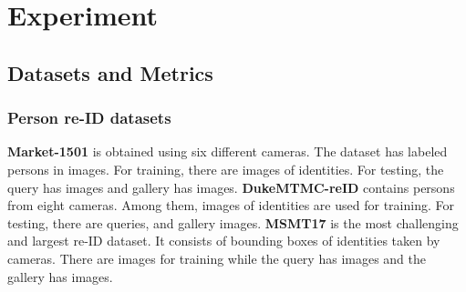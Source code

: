 \documentclass[journal]{IEEEtran}
\begin{document}
\section{Experiment}
\subsection{Datasets and Metrics}
\subsubsection{Person re-ID datasets}
\textbf{Market-1501} \cite{zheng2015scalable} is obtained using six different cameras. The dataset has  labeled persons in  images. For training, there are  images of  identities. For testing, the query has  images and gallery has  images. \textbf{DukeMTMC-reID} \cite{zheng2017unlabeled} contains  persons from eight cameras. Among them,  images of  identities are used for training. For testing, there are  queries, and  gallery images. \textbf{MSMT17} \cite{wei2018person} is the most challenging and largest re-ID dataset. It consists of  bounding boxes of  identities taken by  cameras. There are  images for training while the query has  images and the gallery has  images. 
\end{document}
